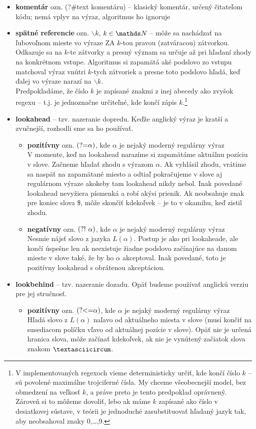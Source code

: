 \begin{itemize}
\item \textbf{komentár} ozn. (?\#text komentáru) -- klasický komentár, určený čitateľom kódu; nemá vplyv na výraz, algoritmus ho ignoruje
\item \textbf{spätné referencie} ozn. $\backslash k$, $k \in\N$ -- môže sa nachádzať na ľubovoľnom mieste vo výraze ZA $k$-tou pravou (zatváracou) zátvorkou. Odkazuje sa na $k$-te zátvorky a presný význam sa určuje až pri hľadaní zhody na konkrétnom vstupe. Algoritmus si zapamätá aké podslovo zo vstupu matchoval výraz vnútri $k$-tych zátvoriek a presne toto podslovo hľadá, keď ďalej vo výraze narazí na $\backslash k$.
\\ Predpokladáme, že číslo $k$ je zapísané znakmi z inej abecedy ako zvyšok regexu -- t.j. je jednoznačne určiteľné, kde končí zápis $k$.\footnote{V implementovaných regexoch vieme deterministicky určiť, kde končí číslo $k$ -- sú povolené maximálne trojciferné čísla. My chceme všeobecnejší model, bez obmedzení na veľkosť $k$, a práve preto je tento predpoklad oprávnený. Zároveň si to môžeme dovoliť, lebo ak máme $k$ zapísané ako číslo v desiatkovej sústave, v teórii je jednoduché zasubstituovať hľadaný jazyk tak, aby neobsahoval znaky 0,\dots,9.}
\item \textbf{lookahead} -- tzv. nazeranie dopredu. Keďže anglický výraz je kratší a zvučnejší, rozhodli sme sa ho používať.
\begin{itemize}
\item \textbf{pozitívny} ozn. $\text{(?=}\alpha)$, kde $\alpha$ je nejaký moderný regulárny výraz 
\\ V momente, keď na lookahead narazíme si zapamätáme aktuálnu pozíciu v slove. Začneme hľadať zhodu s výrazom $\alpha$. Ak vyhlásil zhodu, vrátime sa naspäť na zapamätané miesto a odtiaľ pokračujeme v slove aj regulárnom výraze akokeby tam lookahead nikdy nebol. Inak povedané lookahead nevyžiera písmenká a robí akýsi prienik. Ak neobsahuje znak pre koniec slova \$, môže skončiť kdekoľvek -- je to v okamihu, keď zistil zhodu.
\item \textbf{negatívny} ozn. $\text{(?!~}\alpha)$, kde $\alpha$ je nejaký moderný regulárny výraz \\ Nesmie nájsť slovo z jazyka $L(\alpha)$. Postup je ako pri lookaheade, ale končí úspešne len ak neexistuje žiadne podslovo začínajúce na danom mieste v slove také, že by ho $\alpha$ akceptoval. Inak povedané, toto je pozitívny lookahead s obrátenou akceptáciou.
\end{itemize}
\item \textbf{lookbehind} -- tzv. nazeranie dozadu. Opäť budeme používať anglickú verziu pre jej stručnosť.
\begin{itemize}
\item \textbf{pozitívny} ozn. $\text{(?\textless =}\alpha)$, kde $\alpha$ je nejaký moderný regulárny výraz \\ Hľadá slovo z $L(\alpha)$ naľavo od aktuálneho miesta v slove (musí končiť na susediacom políčku vľavo od aktuálnej pozície v slove). Opäť nie je určená hranica slova, môže začínať kdekoľvek, ak nie je vynútený začiatok slova znakom $\textasciicircum$. 


\end{itemize}
\end{itemize}
